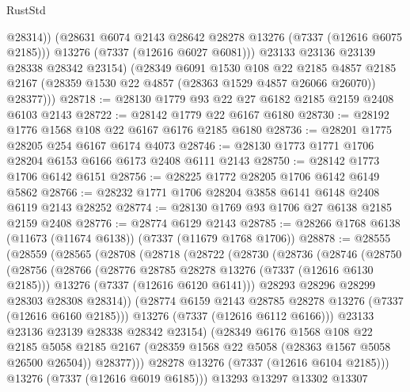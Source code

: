 \begin{lexlean}{RustStd}
\begin{coremodule}
                @28314))
            (@28631 @6074 @2143 @28642 @28278 @13276 (@7337 (@12616 @6075 @2185)))
            @13276
            (@7337 (@12616 @6027 @6081)))
          @23133
          @23136
          @23139
          @28338
          @28342
          @23154)
        (@28349
          @6091
          @1530
          @108
          @22
          @2185
          @4857
          @2185
          @2167
          (@28359 @1530 @22 @4857 (@28363 @1529 @4857 @26066 @26070))
          @28377)))
@28718 := @28130 @1779 @93 @22 @27 @6182 @2185 @2159 @2408 @6103 @2143
@28722 := @28142 @1779 @22 @6167 @6180
@28730 := @28192 @1776 @1568 @108 @22 @6167 @6176 @2185 @6180
@28736 := @28201 @1775 @28205 @254 @6167 @6174 @4073
@28746 := @28130 @1773 @1771 @1706 @28204 @6153 @6166 @6173 @2408 @6111 @2143
@28750 := @28142 @1773 @1706 @6142 @6151
@28756 := @28225 @1772 @28205 @1706 @6142 @6149 @5862
@28766 := @28232 @1771 @1706 @28204 @3858 @6141 @6148 @2408 @6119 @2143 @28252
@28774 := @28130 @1769 @93 @1706 @27 @6138 @2185 @2159 @2408
@28776 := @28774 @6129 @2143
@28785 := @28266 @1768 @6138 (@11673 (@11674 @6138)) (@7337 (@11679 @1768 @1706))
@28878 := @28555
    (@28559
      (@28565
        (@28708
          (@28718
            (@28722
              (@28730
                (@28736
                  (@28746
                    (@28750
                      (@28756
                        (@28766
                          (@28776 @28785 @28278 @13276 (@7337 (@12616 @6130 @2185)))
                          @13276
                          (@7337 (@12616 @6120 @6141)))
                        @28293
                        @28296
                        @28299
                        @28303
                        @28308
                        @28314))
                    (@28774 @6159 @2143 @28785 @28278 @13276 (@7337 (@12616 @6160 @2185)))
                    @13276
                    (@7337 (@12616 @6112 @6166)))
                  @23133
                  @23136
                  @23139
                  @28338
                  @28342
                  @23154)
                (@28349
                  @6176
                  @1568
                  @108
                  @22
                  @2185
                  @5058
                  @2185
                  @2167
                  (@28359 @1568 @22 @5058 (@28363 @1567 @5058 @26500 @26504))
                  @28377)))
            @28278
            @13276
            (@7337 (@12616 @6104 @2185)))
          @13276
          (@7337 (@12616 @6019 @6185)))
        @13293
        @13297
        @13302
        @13307

\end{coremodule}
\end{lexlean}
